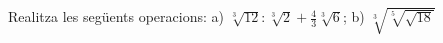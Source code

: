 \begin{autoaval}{30}
\begin{mylist}
\exer[2]  Realitza les següents operacions: a) $\sqrt[{3}]{12}:\sqrt[{3}]{2} +\frac{4}{3}\sqrt[3]{6} $;  \quad b) \quad $\sqrt[{3}]{\sqrt[{5}]{\sqrt{18}} } $  

\end{mylist}
 
\end{autoaval}


\newpage

\resum

